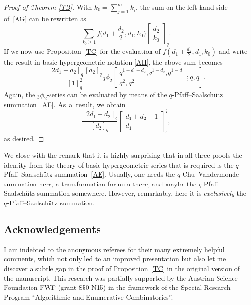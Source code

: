 \documentclass[pdftex]{sigma}
\begin{document}
\begin{proof}[Proof of Theorem \ref{TB}]
With $k_0=\sum_{j=1}^mk_j$,
the sum on the left-hand side of~\eqref{AG} can be rewritten as
\begin{equation*}
\sum_{k_0\ge1}f\biggl(d_1+\frac {d_2} {2},d_1,k_0\biggr)
\begin{bmatrix} d_2\\k_0\end{bmatrix}_q.
\end{equation*}
If we now use Proposition~\ref{TC} for the evaluation of
$f(d_1+\tfrac {d_2} {2},d_1,k_0)$ and write the result
in basic hypergeometric notation \eqref{AH}, the above sum becomes
\begin{equation*}
\frac {[2d_1+d_2]_q\,[d_2]_q} {[1]_q^2}
   {}_3\phi _2\!\left [ \begin{matrix} q^{1+d_1+d_2},q^{1-d_2},q^{1-d_1}\\
q^{2},q^{2}
\end{matrix} ;q,q\right ].
\end{equation*}
Again, the $_3\phi_2$-series can be evaluated by means of the
$q$-Pfaff--Saalsch\"utz summation~\eqref{AE}. As~a~result, we obtain
\begin{equation*}
\frac {[2d_1+d_2]_q} {[d_2]_q}\begin{bmatrix} d_1+d_2-1\\d_1\end{bmatrix}_q^2,
\end{equation*}
as desired.
\end{proof}

We close with the remark that it is highly surprising that in all
three proofs the identity from the theory of basic hypergeometric
series that is required is the $q$-Pfaff--Saalsch\"utz
summation~\eqref{AE}. Usually, one needs the $q$-Chu--Vandermonde summation
here, a transformation formula there, and maybe the $q$-Pfaff--Saalsch\"utz
summation somewhere. However, remarkably, here it is {\it exclusively}
the $q$-Pfaff--Saalsch\"utz summation.

\subsection*{Acknowledgements}

I am indebted to the anonymous referees for their many extremely
helpful comments, which not only led to an improved presentation
but also let me discover a subtle gap in the proof of Proposition~\ref{TC}
in the original version of the manuscript.
This research was partially supported by the Austrian
Science Foundation FWF (grant S50-N15)
in the framework of the Special Research Program
``Algorithmic and Enumerative Combinatorics''.
\end{document}
